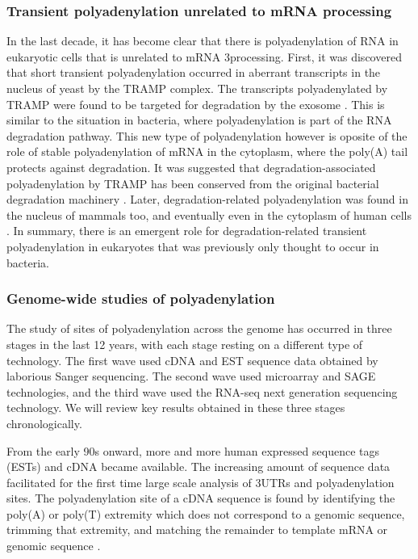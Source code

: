 \subsubsection{Transient polyadenylation unrelated to mRNA processing}
In the last decade, it has become clear that there is polyadenylation of
RNA in eukaryotic cells that is unrelated to mRNA 3\p processing. First, it was
discovered that short transient polyadenylation occurred in aberrant
transcripts in the nucleus of yeast by the TRAMP complex. The transcripts
polyadenylated by TRAMP were found to be targeted for degradation by the
exosome \cite{lacava_rna_2005, wyers_cryptic_2005}. This is similar to the
situation in bacteria, where polyadenylation is part of the RNA degradation
pathway. This new type of polyadenylation however is oposite of the role of
stable polyadenylation of mRNA in the cytoplasm, where the poly(A) tail
protects against degradation. It was suggested that degradation-associated
polyadenylation by TRAMP has been conserved from the original bacterial
degradation machinery \cite{lacava_rna_2005}. Later, degradation-related
polyadenylation was found in the nucleus of mammals too, and eventually even in
the cytoplasm of human cells \cite{slomovic_polyadenylation_2006,
slomovic_addition_2010}. In summary, there is an emergent role for
degradation-related transient polyadenylation in eukaryotes that was previously
only thought to occur in bacteria.

\subsubsection{Genome-wide studies of polyadenylation}
The study of sites of polyadenylation across the genome has occurred in three
stages in the last 12 years, with each stage resting on a different type of
technology. The first wave used cDNA and EST sequence data obtained by
laborious Sanger sequencing. The second wave used microarray and SAGE
technologies, and the third wave used the RNA-seq next generation sequencing
technology. We will review key results obtained in these three stages
chronologically.

From the early 90s onward, more and more human expressed sequence tags (ESTs)
and cDNA became available. The increasing amount of sequence data facilitated
for the first time large scale analysis of 3\p UTRs and polyadenylation sites.
The polyadenylation site of a cDNA sequence is found by identifying the poly(A)
or poly(T) extremity which does not correspond to a genomic sequence, trimming
that extremity, and matching the remainder to template mRNA or genomic sequence
\cite{beaudoing_patterns_2000, tian_large-scale_2005}.

